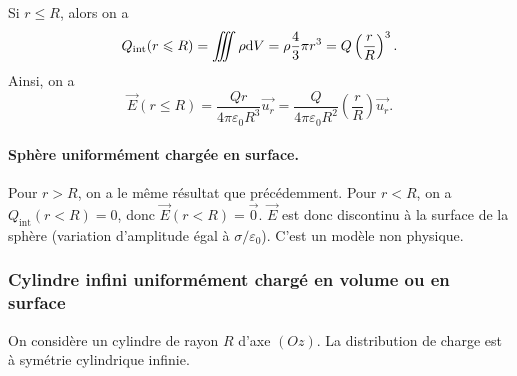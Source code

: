                 Si $r\leqslant R$, alors on a 
                \begin{equation}
                    Q_{\text{int}}(r\leqslant R)=\iiint \rho\mathrm{d} V=\rho\frac{4}{3}\pi r^{3}=Q\left(\frac{r}{R}\right)^{3}.
                \end{equation}
                Ainsi, on a 
                \begin{equation}
                    \boxed{
                        \vec{E}(r\leqslant R)=\frac{Qr}{4\pi\varepsilon_0 R^{3}}\vec{u_r}=\frac{Q}{4\pi\varepsilon_0 R^{2}}\left(\frac{r}{R}\right)\vec{u_r}.
                    }
                \end{equation}

            \paragraph{Sphère uniformément chargée en surface.}

                Pour $r>R$, on a le même résultat que précédemment. Pour $r<R$, on a $Q_{\text{int}}(r<R)=0$, donc $\vec{E}(r<R)=\vec{0}$. $\vec{E}$ est donc discontinu à la surface de la sphère (variation d'amplitude égal à $\sigma/\varepsilon_{0}$). C'est un modèle non physique.                

        \subsubsection{Cylindre infini uniformément chargé en volume ou en surface}

            On considère un cylindre de rayon $R$ d'axe $(Oz)$.
            La distribution de charge est à symétrie cylindrique \og infinie\fg. 

